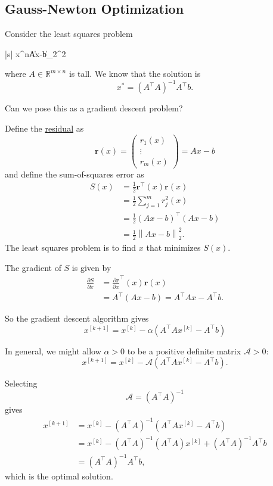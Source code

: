 \documentclass{article}
\newcommand{\norm}[1]{\left\|{#1}\right\|}
\newcommand{\rbf}{\mathbf{r}}
\begin{document}
\subsection{Gauss-Newton Optimization}

Consider the least squares problem
	\begin{mini*}|s|
		{x\in{}^n}{\norm{Ax-b}_2^2}{}{}
	\end{mini*}
where $A\in\mathbb{R}^{m\times n}$ is tall.  We know that the solution is
\[
x^\ast = (A^\top A)^{-1} A^\top b.
\]

Can we pose this as a gradient descent problem?

	Define the \underline{residual} as
	\[
		\rbf(x) = \begin{pmatrix} r_1(x) \\ \vdots \\ r_m(x) \end{pmatrix} = Ax-b
	\]	
	and define the sum-of-squares error as
	\begin{align*}
	S(x) &= \frac{1}{2}\rbf^\top(x)\rbf(x) \\
		 &= \frac{1}{2}\sum_{j=1}^m r_j^2(x) \\
		 &= \frac{1}{2}(Ax-b)^\top (Ax-b) \\
		 &= \frac{1}{2}\norm{Ax-b}_2^2.
	\end{align*}
	The least squares problem is to find $x$ that minimizes $S(x)$.

	The gradient of $S$ is given by
	\begin{align*}
		\frac{\partial S}{\partial x} 
			&= \frac{\partial \rbf}{\partial x}^\top(x) \rbf(x) \\
			&= A^\top (Ax-b) = A^\top A x - A^\top b.
	\end{align*}
	
	So the gradient descent algorithm gives
	\[
	x^{[k+1]} = x^{[k]} - \alpha \left(A^\top A x^{[k]} - A^\top b\right)
	\]
	
	In general, we might allow $\alpha>0$ to be a positive definite matrix $\mathscr{A}>0$:
	\[
	x^{[k+1]} = x^{[k]} - \mathscr{A} \left(A^\top A x^{[k]} - A^\top b\right).
	\]	
	

	Selecting 
	\[
		\mathscr{A} = (A^\top A)^{-1}
	\]	
	gives
	\begin{align*}
	x^{[k+1]} 
		&= x^{[k]} - (A^\top A)^{-1} \left(A^\top A x^{[k]} - A^\top b\right) \\
		&= x^{[k]} - (A^\top A)^{-1} (A^\top A) x^{[k]} + (A^\top A)^{-1} A^\top b \\
		&= (A^\top A)^{-1} A^\top b,
	\end{align*}
	which is the optimal solution.  
	
\end{document}

